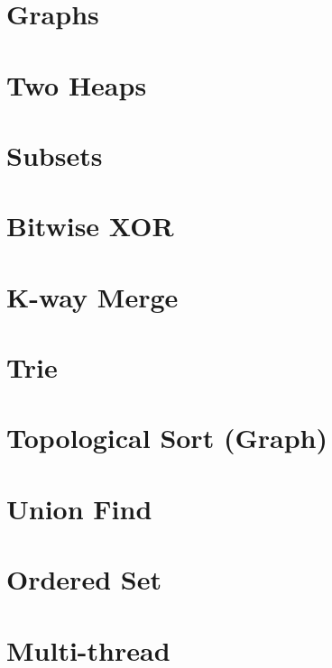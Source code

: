 



\section{Graphs}




\section{Two Heaps}


\section{Subsets}




\section{Bitwise XOR}




\section{K-way Merge}








\section{Trie}


\section{Topological Sort (Graph)}


\section{Union Find}


\section{Ordered Set}


\section{Multi-thread}



